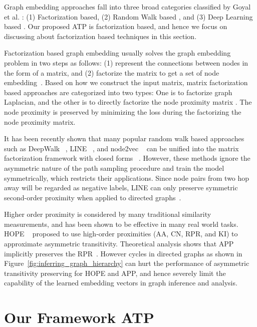 \documentclass[letterpaper]{article} \usepackage{aaai19}  \usepackage{times}  \usepackage{helvet}  \usepackage{courier}  \usepackage{url}  \usepackage{graphicx}  \usepackage{booktabs} \usepackage{xcolor}
\begin{document}
Graph embedding approaches fall into three broad categories classified by Goyal et al. \cite{goyal2017graph}: (1) Factorization based, (2) Random Walk based \cite{kdd14deepwalk,TADW,Gao2018BBN}, and (3) Deep Learning based \cite{Pan2016,Dong2017MSR,SEANO}. Our proposed ATP is factorization based,
and hence we focus on discussing about factorization based techniques in this section. 

Factorization based graph embedding usually solves the graph embedding problem in two steps as follows: (1) represent the connections between nodes in the form of a matrix, and (2) factorize the matrix to get a set of node embedding~\cite{Cai2017Graph,goyal2017graph}. Based on how we construct the input matrix, matrix factorization based approaches are categorized into two types: One is to factorize graph Laplacian, and the other is to directly factorize the node proximity matrix \cite{Cai2017Graph}. The node proximity is preserved by minimizing the loss during the factorizing the node proximity matrix. 

It has been recently shown that many popular random walk based approaches such as DeepWalk ~\cite{kdd14deepwalk}, LINE ~\cite{Tang2015Line}, and node2vec ~\cite{grovernode2vec} can be unified into the matrix factorization framework with closed forms ~\cite{Tang2017EMasMF}. However, these methods ignore the asymmetric nature of the path sampling procedure and train the model symmetrically, which restricts their applications. Since node pairs from two hop away will be regarded as negative labels, LINE can only preserve symmetric second-order proximity when applied to directed graphs~\cite{Zhou2017ScalableGE}.



Higher order proximity is considered by many traditional similarity measurements, and has been shown to be effective in many real world tasks. HOPE ~\cite{Ou2016KDDAsymmetric} proposed to use high-order proximities (AA, CN, RPR, and KI) to approximate asymmetric transitivity. Theoretical analysis shows that APP implicitly preserves the RPR~\cite{Zhou2017ScalableGE}. However cycles in directed graphs as shown in Figure~\ref{fig:inferring_graph_hierarchy} can hurt the performance of asymmetric transitivity preserving for HOPE and APP, and hence severely limit the capability of the learned embedding vectors in graph inference and analysis.







\section{Our Framework ATP}
\label{sec:methodolody}
\end{document}
